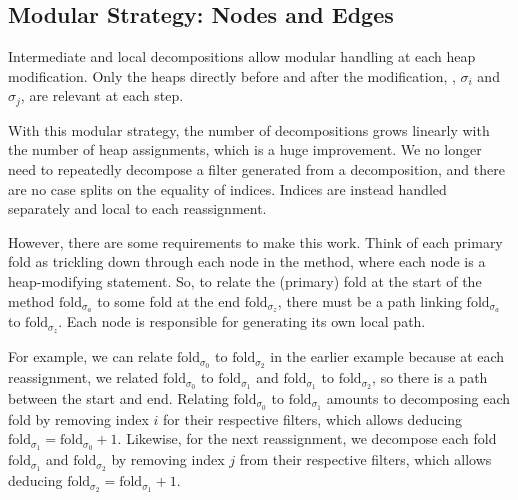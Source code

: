 \documentclass[msc,oneside]{ubcthesis}
\theoremstyle{definition}
\begin{document}
\subsection{Modular Strategy: Nodes and Edges}
Intermediate and local decompositions allow modular handling at each heap modification. Only the heaps directly before and after the modification, \ie, $\sigma_i$ and $\sigma_j$, are relevant at each step.

With this modular strategy, the number of decompositions grows linearly with the number of heap assignments, which is a huge improvement. We no longer need to repeatedly decompose a filter generated from a decomposition, and there are no case splits on the equality of indices. Indices are instead handled separately and local to each reassignment.

However, there are some requirements to make this work. Think of each primary fold as trickling down through each node in the method, where each node is a heap-modifying statement. So, to relate the (primary) fold at the start of the method $\textrm{fold}_{\sigma_a}$ to some fold at the end $\textrm{fold}_{\sigma_z}$, there must be a path linking $\textrm{fold}_{\sigma_a}$ to $\textrm{fold}_{\sigma_z}$. Each node is responsible for generating its own local path.

For example, we can relate $\textrm{fold}_{\sigma_0}$ to $\textrm{fold}_{\sigma_2}$ in the earlier example because at each reassignment, we related $\textrm{fold}_{\sigma_0}$ to $\textrm{fold}_{\sigma_1}$ and $\textrm{fold}_{\sigma_1}$ to $\textrm{fold}_{\sigma_2}$, so there is a path between the start and end. Relating $\textrm{fold}_{\sigma_0}$ to $\textrm{fold}_{\sigma_1}$ amounts to decomposing each fold by removing index $i$ for their respective filters, which allows deducing $\textrm{fold}_{\sigma_1} = \textrm{fold}_{\sigma_0} + 1$. Likewise, for the next reassignment, we decompose each fold $\textrm{fold}_{\sigma_1}$ and $\textrm{fold}_{\sigma_2}$ by removing index $j$ from their respective filters, which allows deducing $\textrm{fold}_{\sigma_2} = \textrm{fold}_{\sigma_1} + 1$. 
\end{document}
